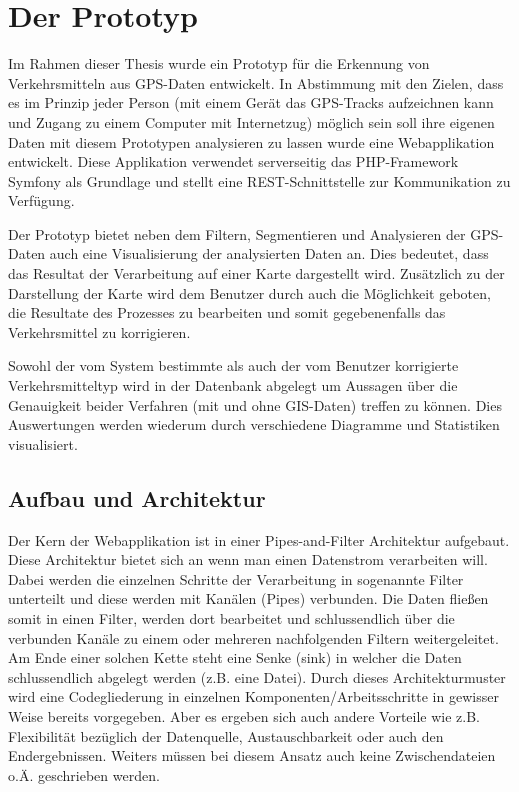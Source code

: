 \chapter{Der Prototyp}

Im Rahmen dieser Thesis  wurde ein Prototyp für die Erkennung von Verkehrsmitteln aus GPS-Daten entwickelt. In Abstimmung mit den Zielen, dass es im Prinzip jeder Person (mit einem Gerät das GPS-Tracks aufzeichnen kann und Zugang zu einem Computer mit Internetzug) möglich sein soll ihre eigenen Daten mit diesem Prototypen analysieren zu lassen wurde eine Webapplikation entwickelt. Diese Applikation verwendet serverseitig das PHP-Framework Symfony als Grundlage und stellt eine REST-Schnittstelle zur Kommunikation zu Verfügung.

Der Prototyp bietet neben dem Filtern, Segmentieren und Analysieren der GPS-Daten auch eine Visualisierung der analysierten Daten an. Dies bedeutet, dass das Resultat der Verarbeitung auf einer Karte dargestellt wird. Zusätzlich zu der Darstellung der Karte wird dem Benutzer durch auch die Möglichkeit geboten, die Resultate des Prozesses zu bearbeiten und somit gegebenenfalls das Verkehrsmittel zu korrigieren. 

Sowohl der vom System bestimmte als auch der vom Benutzer  korrigierte Verkehrsmitteltyp wird in der Datenbank abgelegt um Aussagen über die Genauigkeit beider Verfahren (mit und ohne GIS-Daten) treffen zu können. Dies Auswertungen werden wiederum durch verschiedene Diagramme und Statistiken visualisiert.
\clearpage

\section{Aufbau und Architektur}
Der Kern der Webapplikation ist in einer Pipes-and-Filter Architektur aufgebaut. Diese Architektur bietet sich an wenn man einen Datenstrom verarbeiten will. Dabei werden die einzelnen Schritte der Verarbeitung in sogenannte Filter unterteilt und diese werden mit Kanälen (Pipes) verbunden. Die Daten fließen somit in einen Filter, werden dort bearbeitet und schlussendlich über die verbunden Kanäle zu einem oder mehreren nachfolgenden Filtern weitergeleitet. Am Ende einer solchen Kette steht eine Senke (sink) in welcher die Daten schlussendlich abgelegt werden (z.B. eine Datei). Durch dieses Architekturmuster wird eine Codegliederung in einzelnen Komponenten/Arbeitsschritte in gewisser Weise bereits vorgegeben. Aber es ergeben sich auch andere Vorteile wie z.B. Flexibilität bezüglich der Datenquelle, Austauschbarkeit oder auch den Endergebnissen. Weiters müssen bei diesem Ansatz auch keine Zwischendateien o.Ä. geschrieben werden. \cite{buschmann_pipes_1998} 

